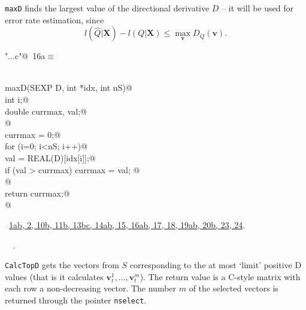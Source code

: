 \documentclass[reqno]{amsart}
\renewcommand{\NWtarget}[2]{\hypertarget{#1}{#2}}
\renewcommand{\NWlink}[2]{\hyperlink{#1}{#2}}
\newcommand{\bv}{\mathbf{v}}
\begin{document}
\texttt{maxD} finds the largest value of the directional derivative $D$ --
it will be used for error rate estimation, since
\begin{equation}\label{E:relerror}
  l(\hat{Q}|\mathbf{X}) - l(Q|\mathbf{X}) \leq  \max_\bv D_Q(\bv).
\end{equation}

\begin{flushleft} \small
\begin{minipage}{\linewidth}\label{scrap26}\raggedright\small
\NWtarget{nuweb16a}{} \verb@"..\src\ReprodCalcs.c"@\nobreak\ {\footnotesize {16a}}$\equiv$
\vspace{-1ex}
\begin{list}{}{} \item
\mbox{}\verb@@\\
\mbox{}\verb@double maxD(SEXP D, int *idx, int nS){@\\
\mbox{}\verb@   int i;@\\
\mbox{}\verb@   double currmax, val;@\\
\mbox{}\verb@   @\\
\mbox{}\verb@   currmax = 0;@\\
\mbox{}\verb@   for (i=0; i<nS; i++){@\\
\mbox{}\verb@           val = REAL(D)[idx[i]];@\\
\mbox{}\verb@           if (val > currmax) currmax = val; @\\
\mbox{}\verb@   }@\\
\mbox{}\verb@   return currmax;@\\
\mbox{}\verb@}@\\
\mbox{}\verb@@{\NWsep}
\end{list}
\vspace{-1.5ex}
\footnotesize
\begin{list}{}{\setlength{\itemsep}{-\parsep}\setlength{\itemindent}{-\leftmargin}}
\item \NWtxtFileDefBy\ \NWlink{nuweb1a}{1a}\NWlink{nuweb1b}{b}\NWlink{nuweb2}{, 2}\NWlink{nuweb10b}{, 10b}\NWlink{nuweb11b}{, 11b}\NWlink{nuweb13b}{, 13b}\NWlink{nuweb13c}{c}\NWlink{nuweb14a}{, 14a}\NWlink{nuweb14b}{b}\NWlink{nuweb15}{, 15}\NWlink{nuweb16a}{, 16a}\NWlink{nuweb16b}{b}\NWlink{nuweb17}{, 17}\NWlink{nuweb18}{, 18}\NWlink{nuweb19a}{, 19a}\NWlink{nuweb19b}{b}\NWlink{nuweb20b}{, 20b}\NWlink{nuweb23}{, 23}\NWlink{nuweb24}{, 24}.
\item \NWtxtIdentsDefed\nobreak\  \verb@MaxD@\nobreak\ \NWtxtIdentsNotUsed.
\item{}
\end{list}
\end{minipage}\vspace{4ex}
\end{flushleft}
\texttt{CalcTopD} gets the vectors from $S$ corresponding to the at most 
`limit' positive D values (that is it calculates $\bv^1_t, \ldots, \bv^m_t$).
The return value is a C-style matrix with each row a non-decreasing vector.
The number $m$ of the selected vectors is returned through the pointer 
\texttt{nselect}.
\end{document}
